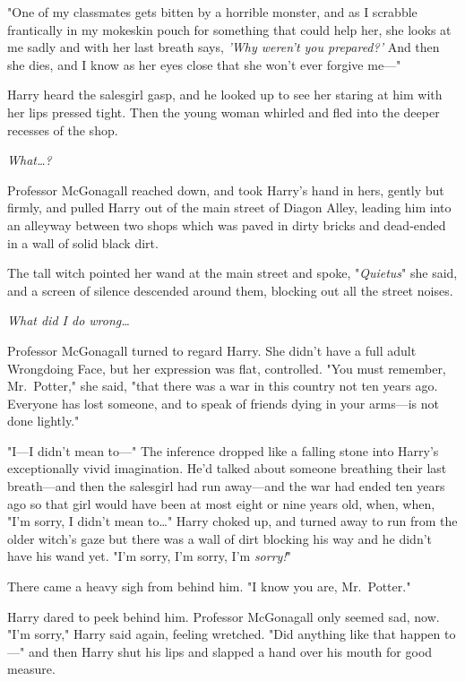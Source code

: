 "One of my classmates gets bitten by a horrible monster, and as I scrabble 
frantically in my mokeskin pouch for something that could help her, she looks 
at me sadly and with her last breath says, \emph{'Why weren't you prepared?'} 
And then she dies, and I know as her eyes close that she won't ever forgive 
me---"

Harry heard the salesgirl gasp, and he looked up to see her staring at him with 
her lips pressed tight. Then the young woman whirled and fled into the deeper 
recesses of the shop.

\emph{What{\ldots}?}

Professor McGonagall reached down, and took Harry's hand in hers, gently but 
firmly, and pulled Harry out of the main street of Diagon Alley, leading him 
into an alleyway between two shops which was paved in dirty bricks and 
dead-ended in a wall of solid black dirt.

The tall witch pointed her wand at the main street and spoke, "\emph{Quietus}" 
she said, and a screen of silence descended around them, blocking out all the 
street noises.

\emph{What did I do wrong{\ldots}}

Professor McGonagall turned to regard Harry. She didn't have a full adult 
Wrongdoing Face, but her expression was flat, controlled. "You must remember, 
Mr.~Potter," she said, "that there was a war in this country not ten years ago. 
Everyone has lost someone, and to speak of friends dying in your arms---is not 
done lightly."

"I---I didn't mean to---" The inference dropped like a falling stone into 
Harry's exceptionally vivid imagination. He'd talked about someone breathing 
their last breath---and then the salesgirl had run away---and the war had ended 
ten years ago so that girl would have been at most eight or nine years old, 
when, when, "I'm sorry, I didn't mean to{\ldots}" Harry choked up, and turned 
away to run from the older witch's gaze but there was a wall of dirt blocking 
his way and he didn't have his wand yet. "I'm sorry, I'm sorry, I'm 
\emph{sorry!}"

There came a heavy sigh from behind him. "I know you are, Mr.~Potter."

Harry dared to peek behind him. Professor McGonagall only seemed sad, now. "I'm 
sorry," Harry said again, feeling wretched. "Did anything like that happen 
to---" and then Harry shut his lips and slapped a hand over his mouth for good 
measure.

